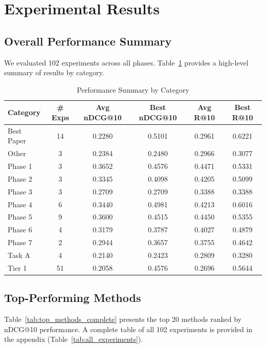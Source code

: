 \documentclass[11pt]{article}
\begin{document}
\section{Experimental Results}

\subsection{Overall Performance Summary}

We evaluated 102 experiments across all phases. Table~\ref{tab:category_summary} provides a high-level summary of results by category.

\begin{table}[h]
\centering
\caption{Performance Summary by Category}
\label{tab:category_summary}
\small
\begin{tabular}{lccccc}
\toprule
\textbf{Category} & \textbf{\# Exps} & \textbf{Avg nDCG@10} & \textbf{Best nDCG@10} & \textbf{Avg R@10} & \textbf{Best R@10} \\
\midrule
Best Paper & 14 & 0.2280 & 0.5101 & 0.2961 & 0.6221 \\
Other & 3 & 0.2384 & 0.2480 & 0.2966 & 0.3077 \\
Phase 1 & 3 & 0.3652 & 0.4576 & 0.4471 & 0.5331 \\
Phase 2 & 3 & 0.3345 & 0.4098 & 0.4205 & 0.5099 \\
Phase 3 & 3 & 0.2709 & 0.2709 & 0.3388 & 0.3388 \\
Phase 4 & 6 & 0.3440 & 0.4981 & 0.4213 & 0.6016 \\
Phase 5 & 9 & 0.3600 & 0.4515 & 0.4450 & 0.5355 \\
Phase 6 & 4 & 0.3179 & 0.3787 & 0.4027 & 0.4879 \\
Phase 7 & 2 & 0.2944 & 0.3657 & 0.3755 & 0.4642 \\
Task A & 4 & 0.2140 & 0.2423 & 0.2809 & 0.3280 \\
Tier 1 & 51 & 0.2058 & 0.4576 & 0.2696 & 0.5644 \\
\bottomrule
\end{tabular}
\end{table}

\subsection{Top-Performing Methods}

Table~\ref{tab:top_methods_complete} presents the top 20 methods ranked by nDCG@10 performance. A complete table of all 102 experiments is provided in the appendix (Table~\ref{tab:all_experiments}).
\end{document}
